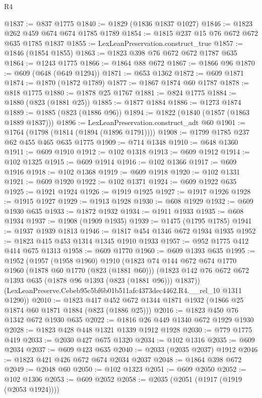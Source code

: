 \begin{lexlean}{R4}
\begin{coremodule}
@1837 := @837 @1775
@1840 := @1829 (@1836 @1837 @1027)
@1846 := @1823 @262 @459 @674 @674 @1785 @1789
@1854 := @1815 @237 @15 @76 @672 @672 @635 @1785 @1837
@1855 := LexLeanPreservation.construct_true
@1857 := @1846 (@1854 @1855)
@1863 := @1823 @398 @76 @672 @672 @1787 @635
@1864 := @1243 @1775
@1866 := @1864 @88 @672
@1867 := @1866 @96
@1870 := @609 (@648 (@649 @1294))
@1871 := @653 @1362
@1872 := @609 @1871
@1874 := @1870 (@1872 @1789)
@1877 := @1867 @1874 @60 @1787
@1878 := @818 @1775
@1880 := @1878 @25 @1767
@1881 := @824 @1775
@1884 := @1880 (@823 (@1881 @25))
@1885 := @1877 @1884
@1886 := @1273 @1874
@1889 := @1885 (@823 (@1886 @96))
@1894 := @1822 (@1840 (@1857 (@1863 @1889 @1837)))
@1896 := LexLeanPreservation.construct_adt @60
@1901 := @1764 (@1798 (@1814 (@1894 (@1896 @1791))))
@1908 := @1799 @1785 @237 @62 @455 @465 @635 @1775
@1909 := @714 @1348
@1910 := @648 @1360
@1911 := @609 @1910
@1912 := @102 @1318
@1913 := @609 @1912
@1914 := @102 @1325
@1915 := @609 @1914
@1916 := @102 @1366
@1917 := @609 @1916
@1918 := @102 @1368
@1919 := @609 @1918
@1920 := @102 @1331
@1921 := @609 @1920
@1922 := @102 @1371
@1924 := @609 @1922 @635
@1925 := @1921 @1924
@1926 := @1919 @1925
@1927 := @1917 @1926
@1928 := @1915 @1927
@1929 := @1913 @1928
@1930 := @608 @1929
@1932 := @609 @1930 @635
@1933 := @1872 @1932
@1934 := @1911 @1933
@1935 := @608 @1934
@1937 := @1908 (@1909 @1935)
@1939 := @1475 (@1795 @1785)
@1941 := @1937 @1939 @1813
@1946 := @1817 @454 @1346 @672 @1934 @1935
@1952 := @1823 @415 @453 @1314 @1345 @1910 @1933
@1957 := @952 @1775 @412 @414 @675 @1313
@1958 := @609 @1770
@1960 := @609 @1393 @635
@1995 := @1952
    (@1957
      (@1958 @1960)
      @1910
      (@1823
        @74
        @144
        @672
        @674
        @1770
        @1960
        (@1878 @60 @1770 (@823 (@1881 @60)))
        (@1823 @142 @76 @672 @672 @1393 @635 (@1878 @96 @1393 (@823 (@1881 @96))) @1837))
      (LexLeanPreserve.Cebeb95c5bf6b01b511afc4373dec4462.R4.__rel_10 @1311 @1290))
@2010 := @1823 @417 @452 @672 @1344 @1871 @1932 (@1866 @25 @1874 @60 @1871 @1884 (@823 (@1886 @25)))
@2016 := @1823 @450 @76 @1342 @672 @1930 @635
@2022 := @1816 @26 @449 @1340 @672 @1929 @1930
@2028 := @1823 @428 @448 @1321 @1339 @1912 @1928
@2030 := @779 @1775 @419
@2033 := @2030 @427 @675 @1320
@2034 := @102 @1316
@2035 := @609 @2034
@2037 := @609 @423 @635
@2040 := @2033 (@2035 @2037) @1912
@2046 := @1823 @421 @426 @672 @674 @2034 @2037
@2048 := @1864 @398 @672
@2049 := @2048 @60
@2050 := @102 @1323
@2051 := @609 @2050
@2052 := @102 @1306
@2053 := @609 @2052
@2058 := @2035 (@2051 (@1917 (@1919 (@2053 @1924))))

\end{coremodule}
\end{lexlean}
